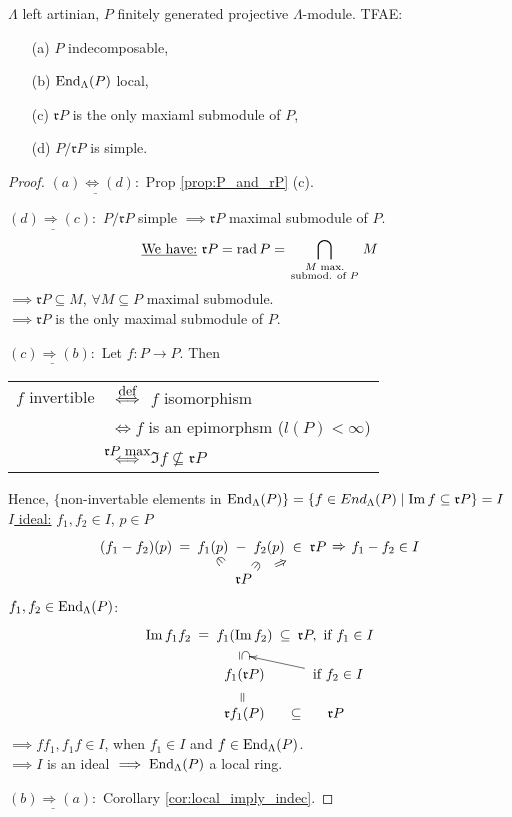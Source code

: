 \begin{prop}
\label{prop:local_iff_proj-indec}
$\Lambda$ left artinian, $P$ finitely generated projective $\Lambda$-module. TFAE:
\begin{enumerate}
\item[(a)] $P$ indecomposable, 
\item[(b)] $\operatorname{End}_\Lambda(P)$ local, 
\item[(c)] $\mathfrak{r}P$ is the only maxiaml submodule of $P$, 
\item[(d)] $P/ \mathfrak{r}P$ is simple.
\end{enumerate}
\end{prop}
\begin{proof}
$\underline{(a) \iff (d):}$ Prop \ref{prop:P_and_rP} (c).

$\underline{(d) \Rightarrow (c):}$ $P/\mathfrak{r}P$ simple $\implies \mathfrak{r}P$ maximal submodule of $P$.\\
$$\text{\underline{We have:} } \mathfrak{r}P = \operatorname{rad}\nolimits P = \bigcap_{\begin{smallmatrix} M \text{ max.} \\ \text{submod. of } P\end{smallmatrix}} M$$
$\implies \mathfrak{r}P \subseteq M$, $\forall M \subseteq P$ maximal submodule.\\
$\implies \mathfrak{r}P$ is the only maximal submodule of $P$.

$\underline{(c) \Rightarrow (b):}$ Let $f: P \to P$. Then\\ \begin{tabular}{cl}
$f$ invertible &$\stackrel{\mathclap{\normalfont\mbox{def}}}{\iff}$ $f$ isomorphism\\
&$\iff f$ is an epimorphsm ($l(P) < \infty$)\\
&$\stackrel{\mathclap{\normalfont\mbox{$\mathfrak{r}P$ max}}}{\iff}$ $\Im f \not\subseteq \mathfrak{r}P$
\end{tabular}
Hence, $\{ $non-invertable elements in $\operatorname{End}_\Lambda(P) \} = \{ f \in End_\Lambda(P) \mid \operatorname{Im}\nolimits f \subseteq \mathfrak{r}P \} = I$\\
\underline{$I$ ideal:} $f_1, f_2 \in I$, $p \in P$
\[\xy
\xymatrix"eq"@C-1pc{
(f_1-f_2)(p) \ar@{}[r]|-*[@]{=} & f_1(p) \ar@{}[r]|-*[@]{-} & f_2(p) \ar@{}[r]|-*[@]{\in} & \mathfrak{r}P \ar@{}[r]|-*[@]{\Rightarrow} & f_1-f_2 \in I
}
\POS(27, -8)
\xymatrix{
\mathfrak{r}P \ar@{}["eq"r]|-*[@]{\ni} \ar@{}["eq"rr]|-*[@]{\ni} \ar@{}["eq"rrr]|-*[@]{\Rightarrow}
}
\endxy\]
$f_1, f_2 \in \operatorname{End}_\Lambda(P)$:
\[\xymatrix@R-1pc@C-1pc{
\Im f_1f_2 \ar@{}[r]|-*[@]{=} & f_1(\Im f_2) \ar@{}[r]|-*[@]{\subseteq} \ar@{}[d]|-*[@]{\subseteq}="ar" & \mathfrak{r}P, \text{ if } f_1 \in I\\
           & f_1(\mathfrak{r}P) \ar@{}[d]|-*[@]{=} & \text{ if } f_2 \in I \ar"ar"\\
           & \mathfrak{r}f_1(P) \ar@{}[r]|-*[@]{\subseteq} & \mathfrak{r}P
}\]
$\implies ff_1, f_1f \in I$, when $f_1 \in I$ and $f \in \operatorname{End}_\Lambda(P)$.\\
$\implies I$ is an ideal $\implies \operatorname{End}_\Lambda(P)$ a local ring.

$\underline{(b) \Rightarrow (a):}$ Corollary \ref{cor:local_imply_indec}.
\end{proof}


